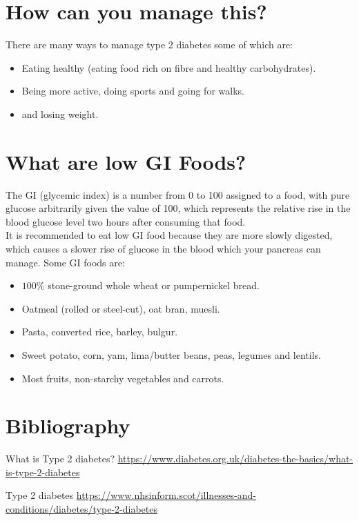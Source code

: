 \documentclass[letterpaper,12pt]{article}
\begin{document}
\section{How can you manage this?}
There are many ways to manage type 2 diabetes some of which are:
\begin{itemize}
 \item Eating healthy (eating food rich on fibre and healthy carbohydrates).
 \item Being more active, doing sports and going for walks.
 \item and losing weight.
\end{itemize}

\section{What are low GI Foods?}
The GI (glycemic index) is a number from 0 to 100 assigned to a food, with pure glucose arbitrarily given the value of 100, which represents the relative rise in the blood glucose level two hours after consuming that food.\\

It is recommended to eat low GI food because they are more slowly digested, which causes a slower rise of glucose in the blood which your pancreas can manage.
Some GI foods are:
\begin{itemize}
 \item $100\%$ stone-ground whole wheat or pumpernickel bread.
 \item Oatmeal (rolled or steel-cut), oat bran, muesli.
 \item Pasta, converted rice, barley, bulgur.
 \item Sweet potato, corn, yam, lima/butter beans, peas, legumes and lentils.
 \item Most fruits, non-starchy vegetables and carrots.
\end{itemize}

\nocite{whatis}
\nocite{type2}

\section{Bibliography}

\begin{thebibliography}{99}

What is Type 2 diabetes?
    \href{https://www.diabetes.org.uk/diabetes-the-basics/what-is-type-2-diabetes}{https://www.diabetes.org.uk/diabetes-the-basics/what-is-type-2-diabetes}

Type 2 diabetes
    \href{https://www.nhsinform.scot/illnesses-and-conditions/diabetes/type-2-diabetes}{https://www.nhsinform.scot/illnesses-and-conditions/diabetes/type-2-diabetes}


\end{thebibliography}
\end{document}
